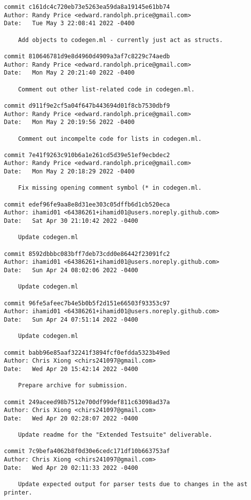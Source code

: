 {\begin{verbatim}
commit c161dc4c720eb73e5263ea59da8a19145e61bb74
Author: Randy Price <edward.randolph.price@gmail.com>
Date:   Tue May 3 22:08:41 2022 -0400

    Add objects to codegen.ml - currently just act as structs.

commit 810646781d9e8d4960d4909a3af7c8229c74aedb
Author: Randy Price <edward.randolph.price@gmail.com>
Date:   Mon May 2 20:21:40 2022 -0400

    Comment out other list-related code in codegen.ml.

commit d911f9e2cf5a04f647b443694d01f8cb7530dbf9
Author: Randy Price <edward.randolph.price@gmail.com>
Date:   Mon May 2 20:19:56 2022 -0400

    Comment out incompelte code for lists in codegen.ml.

commit 7e41f9263c910b6a1e261cd5d39e51ef9ecbdec2
Author: Randy Price <edward.randolph.price@gmail.com>
Date:   Mon May 2 20:18:29 2022 -0400

    Fix missing opening comment symbol (* in codegen.ml.

commit edef96fe9aa8e8d31ee303c05dffb6d1cb520eca
Author: ihamid01 <64386261+ihamid01@users.noreply.github.com>
Date:   Sat Apr 30 21:10:42 2022 -0400

    Update codegen.ml

commit 8592dbbbc083bff7deb73cdd0e86442f23091fc2
Author: ihamid01 <64386261+ihamid01@users.noreply.github.com>
Date:   Sun Apr 24 08:02:06 2022 -0400

    Update codegen.ml

commit 96fe5afeec7b4e5b0b5f2d151e66503f93353c97
Author: ihamid01 <64386261+ihamid01@users.noreply.github.com>
Date:   Sun Apr 24 07:51:14 2022 -0400

    Update codegen.ml

commit babb96e85aaf32241f3894fcf0efdda5323b49ed
Author: Chris Xiong <chirs241097@gmail.com>
Date:   Wed Apr 20 15:42:14 2022 -0400

    Prepare archive for submission.

commit 249aceed98b7512e700df99def811c63098ad37a
Author: Chris Xiong <chirs241097@gmail.com>
Date:   Wed Apr 20 02:28:07 2022 -0400

    Update readme for the "Extended Testsuite" deliverable.

commit 7c9befa4062b8f0d30e6cedc171df10b663753af
Author: Chris Xiong <chirs241097@gmail.com>
Date:   Wed Apr 20 02:11:33 2022 -0400

    Update expected output for parser tests due to changes in the ast printer.


\end{verbatim}}
